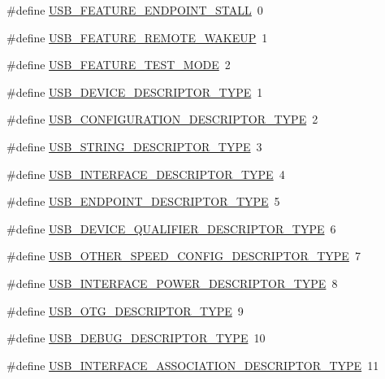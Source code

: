 \begin{DoxyCompactItemize}
\item 
\#define \hyperlink{group__USBD__Core_ga3ff0518fb298c9c9b556f59c0468ec0d}{U\-S\-B\-\_\-\-F\-E\-A\-T\-U\-R\-E\-\_\-\-E\-N\-D\-P\-O\-I\-N\-T\-\_\-\-S\-T\-A\-L\-L}~0
\item 
\#define \hyperlink{group__USBD__Core_ga2185a0541f4155470596c9c739c1656b}{U\-S\-B\-\_\-\-F\-E\-A\-T\-U\-R\-E\-\_\-\-R\-E\-M\-O\-T\-E\-\_\-\-W\-A\-K\-E\-U\-P}~1
\item 
\#define \hyperlink{group__USBD__Core_ga90a1a76a81c04849dc897dacf6c3a213}{U\-S\-B\-\_\-\-F\-E\-A\-T\-U\-R\-E\-\_\-\-T\-E\-S\-T\-\_\-\-M\-O\-D\-E}~2
\end{DoxyCompactItemize}
\begin{DoxyCompactItemize}
\item 
\#define \hyperlink{group__USBD__Core_ga722f2d6ee2892228b6708e8b9904c645}{U\-S\-B\-\_\-\-D\-E\-V\-I\-C\-E\-\_\-\-D\-E\-S\-C\-R\-I\-P\-T\-O\-R\-\_\-\-T\-Y\-P\-E}~1
\item 
\#define \hyperlink{group__USBD__Core_ga45e81401e4b530280fdd539da1b06c26}{U\-S\-B\-\_\-\-C\-O\-N\-F\-I\-G\-U\-R\-A\-T\-I\-O\-N\-\_\-\-D\-E\-S\-C\-R\-I\-P\-T\-O\-R\-\_\-\-T\-Y\-P\-E}~2
\item 
\#define \hyperlink{group__USBD__Core_gab01c9c74f2eb266b20aecd48bab4b35c}{U\-S\-B\-\_\-\-S\-T\-R\-I\-N\-G\-\_\-\-D\-E\-S\-C\-R\-I\-P\-T\-O\-R\-\_\-\-T\-Y\-P\-E}~3
\item 
\#define \hyperlink{group__USBD__Core_gad1699884fa580bba35246a566264c978}{U\-S\-B\-\_\-\-I\-N\-T\-E\-R\-F\-A\-C\-E\-\_\-\-D\-E\-S\-C\-R\-I\-P\-T\-O\-R\-\_\-\-T\-Y\-P\-E}~4
\item 
\#define \hyperlink{group__USBD__Core_ga4e8d6d81a224f8b511edc92b6cb4e085}{U\-S\-B\-\_\-\-E\-N\-D\-P\-O\-I\-N\-T\-\_\-\-D\-E\-S\-C\-R\-I\-P\-T\-O\-R\-\_\-\-T\-Y\-P\-E}~5
\item 
\#define \hyperlink{group__USBD__Core_ga7158946184590ea6cfcb406d7f3c4ce5}{U\-S\-B\-\_\-\-D\-E\-V\-I\-C\-E\-\_\-\-Q\-U\-A\-L\-I\-F\-I\-E\-R\-\_\-\-D\-E\-S\-C\-R\-I\-P\-T\-O\-R\-\_\-\-T\-Y\-P\-E}~6
\item 
\#define \hyperlink{group__USBD__Core_ga0d886bcc28cf10d730106d7be9b661fd}{U\-S\-B\-\_\-\-O\-T\-H\-E\-R\-\_\-\-S\-P\-E\-E\-D\-\_\-\-C\-O\-N\-F\-I\-G\-\_\-\-D\-E\-S\-C\-R\-I\-P\-T\-O\-R\-\_\-\-T\-Y\-P\-E}~7
\item 
\#define \hyperlink{group__USBD__Core_ga3356db66a2c62f7018f23f9189ba34c9}{U\-S\-B\-\_\-\-I\-N\-T\-E\-R\-F\-A\-C\-E\-\_\-\-P\-O\-W\-E\-R\-\_\-\-D\-E\-S\-C\-R\-I\-P\-T\-O\-R\-\_\-\-T\-Y\-P\-E}~8
\item 
\#define \hyperlink{group__USBD__Core_ga0e105187070c79d5843dde5503bb78f2}{U\-S\-B\-\_\-\-O\-T\-G\-\_\-\-D\-E\-S\-C\-R\-I\-P\-T\-O\-R\-\_\-\-T\-Y\-P\-E}~9
\item 
\#define \hyperlink{group__USBD__Core_ga9d5ac46d5f303464ac827d63f9da984e}{U\-S\-B\-\_\-\-D\-E\-B\-U\-G\-\_\-\-D\-E\-S\-C\-R\-I\-P\-T\-O\-R\-\_\-\-T\-Y\-P\-E}~10
\item 
\#define \hyperlink{group__USBD__Core_ga2ab1841a48da627b702526b01eb31268}{U\-S\-B\-\_\-\-I\-N\-T\-E\-R\-F\-A\-C\-E\-\_\-\-A\-S\-S\-O\-C\-I\-A\-T\-I\-O\-N\-\_\-\-D\-E\-S\-C\-R\-I\-P\-T\-O\-R\-\_\-\-T\-Y\-P\-E}~11
\end{DoxyCompactItemize}
